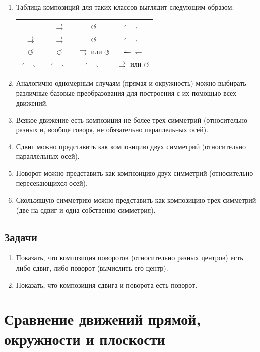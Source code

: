 \begin{enumerate}
\begin{enumerate}[a)]
\end{enumerate}
\item Таблица композиций для таких классов выглядит следующим образом:
\begin{center}
\begin{tabular}{c|ccc}
 & $\rightrightarrows$ & $\circlearrowleft$ &  $\leftharpoonup\leftharpoondown$ \\ \hline
$\rightrightarrows$ & $\rightrightarrows$ &  $\circlearrowleft$ &  $\leftharpoonup\leftharpoondown$  \\ 
$\circlearrowleft$ & $\circlearrowleft$ & $\rightrightarrows$ или $\circlearrowleft$ & $\leftharpoonup\leftharpoondown$  \\ 
$\leftharpoonup\leftharpoondown$ & $\leftharpoonup\leftharpoondown$ & $\leftharpoonup\leftharpoondown$ & $\rightrightarrows$ или $\circlearrowleft$  \\ 
\end{tabular}
\end{center}
\item Аналогично одномерным случаям (прямая и окружность) можно выбирать различные базовые преобразования для построения с их помощью всех движений. 
\item Всякое движение есть композиция не более трех симметрий (относительно разных и, вообще говоря, не обязательно параллельных осей).
\item Сдвиг можно представить как композицию двух симметрий (относительно параллельных осей).
\item Поворот можно представить как композицию двух симметрий (относительно пересекающихся осей).
\item Скользящую симметрию можно представить как композицию трех симметрий (две на сдвиг и одна собственно симметрия).
\end{enumerate}


\subsection{Задачи}
\begin{enumerate}
\item Показать, что композиция поворотов (относительно разных центров) есть либо сдвиг, либо поворот (вычислить его центр).
\item Показать, что композиция сдвига и поворота есть поворот.
\end{enumerate}



\section{Сравнение движений прямой, окружности и плоскости}
